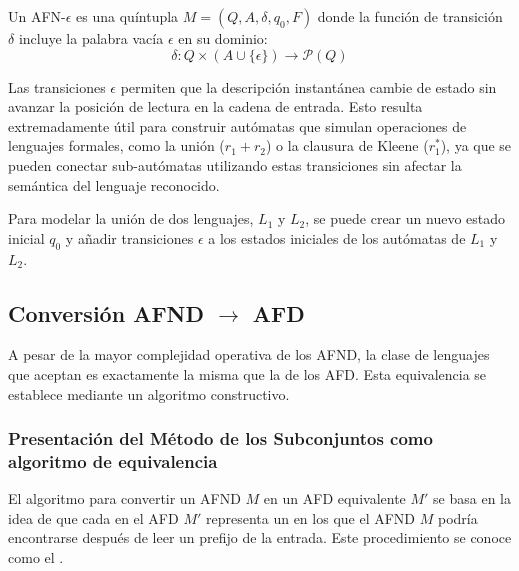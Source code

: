 Un AFN-$\epsilon$ es una quíntupla $M = (Q, A, \delta, q_0, F)$ donde la función de transición $\delta$ incluye la palabra vacía $\epsilon$ en su dominio:
\[ \delta : Q \times (A \cup \{\epsilon\}) \to \mathcal{P}(Q) \]

Las transiciones $\epsilon$ permiten que la descripción instantánea cambie de estado sin avanzar la posición de lectura en la cadena de entrada. Esto resulta extremadamente útil para construir autómatas que simulan operaciones de lenguajes formales, como la unión ($r_1 + r_2$) o la clausura de Kleene ($r_1^*$), ya que se pueden conectar sub-autómatas utilizando estas transiciones sin afectar la semántica del lenguaje reconocido.

\begin{ejemplo}
Para modelar la unión de dos lenguajes, $L_1$ y $L_2$, se puede crear un nuevo estado inicial $q_0$ y añadir transiciones $\epsilon$ a los estados iniciales de los autómatas de $L_1$ y $L_2$.
\end{ejemplo}

\subsection{Conversión AFND $\to$ AFD} %

A pesar de la mayor complejidad operativa de los AFND, la clase de lenguajes que aceptan es exactamente la misma que la de los AFD. Esta equivalencia se establece mediante un algoritmo constructivo.

\subsubsection{Presentación del Método de los Subconjuntos como algoritmo de equivalencia}

El algoritmo para convertir un AFND $M$ en un AFD equivalente $M'$ se basa en la idea de que cada  en el AFD $M'$ representa un  en los que el AFND $M$ podría encontrarse después de leer un prefijo de la entrada. Este procedimiento se conoce como el .

